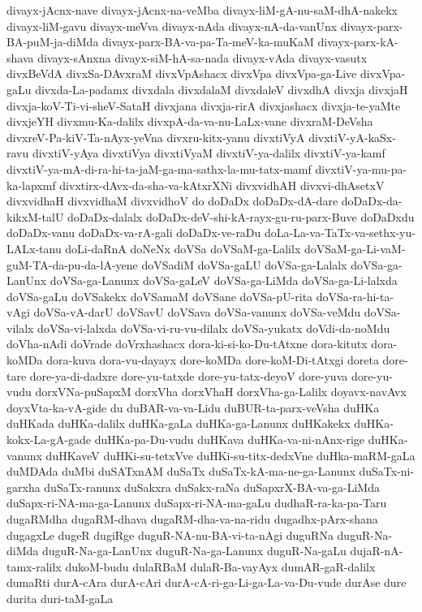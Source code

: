 {divayx-jAcnx-nave
divayx-jAcnx-na-veMba
divayx-liM-gA-nu-saM-dhA-nakekx
divayx-liM-gavu
divayx-meVva
divayx-nAda
divayx-nA-da-vanUnx
divayx-parx-BA-puM-ja-diMda
divayx-parx-BA-va-pa-Ta-meV-ka-muKaM
divayx-parx-kA-shava
divayx-sAnxna
divayx-siM-hA-sa-nada
divayx-vAda
divayx-vasutx
divxBeVdA
divxSa-DAvxraM
divxVpAshacx
divxVpa
divxVpa-ga-Live
divxVpa-gaLu
divxda-La-padamx
divxdala
divxdalaM
divxdaleV
divxdhA
divxja
divxjaH
divxja-koV-Ti-vi-sheV-SataH
divxjana
divxja-rirA
divxjashacx
divxja-te-yaMte
divxjeYH
divxmu-Ka-dalilx
divxpA-da-va-nu-LaLx-vane
divxraM-DeVsha
divxreV-Pa-kiV-Ta-nAyx-yeVna
divxru-kitx-yanu
divxtiVyA
divxtiV-yA-kaSx-ravu
divxtiV-yAya
divxtiVya
divxtiVyaM
divxtiV-ya-dalilx
divxtiV-ya-kamf
divxtiV-ya-mA-di-ra-hi-ta-jaM-ga-ma-sathx-la-mu-tatx-mamf
divxtiV-ya-mu-pa-ka-lapxmf
divxtirx-dAvx-da-sha-va-kAtxrXNi
divxvidhAH
divxvi-dhAsetxV
divxvidhaH
divxvidhaM
divxvidhoV
do
doDaDx
doDaDx-dA-dare
doDaDx-da-kikxM-talU
doDaDx-dalalx
doDaDx-deV-shi-kA-rayx-gu-ru-parx-Buve
doDaDxdu
doDaDx-vanu
doDaDx-va-rA-gali
doDaDx-ve-raDu
doLa-La-va-TaTx-va-sethx-yu-LALx-tanu
doLi-daRnA
doNeNx
doVSa
doVSaM-ga-Lalilx
doVSaM-ga-Li-vaM-guM-TA-da-pu-da-lA-yene
doVSadiM
doVSa-gaLU
doVSa-ga-Lalalx
doVSa-ga-LanUnx
doVSa-ga-Lanunx
doVSa-gaLeV
doVSa-ga-LiMda
doVSa-ga-Li-lalxda
doVSa-gaLu
doVSakekx
doVSamaM
doVSane
doVSa-pU-rita
doVSa-ra-hi-ta-vAgi
doVSa-vA-darU
doVSavU
doVSava
doVSa-vanunx
doVSa-veMdu
doVSa-vilalx
doVSa-vi-lalxda
doVSa-vi-ru-vu-dilalx
doVSa-yukatx
doVdi-da-noMdu
doVha-nAdi
doVrade
doVrxhashacx
dora-ki-si-ko-Du-tAtxne
dora-kitutx
dora-koMDa
dora-kuva
dora-vu-dayayx
dore-koMDa
dore-koM-Di-tAtxgi
doreta
dore-tare
dore-ya-di-dadxre
dore-yu-tatxde
dore-yu-tatx-deyoV
dore-yuva
dore-yu-vudu
dorxVNa-puSapxM
dorxVha
dorxVhaH
dorxVha-ga-Lalilx
doyavx-navAvx
doyxVta-ka-vA-gide
du
duBAR-va-va-Lidu
duBUR-ta-parx-veVsha
duHKa
duHKada
duHKa-dalilx
duHKa-gaLa
duHKa-ga-Lanunx
duHKakekx
duHKa-kokx-La-gA-gade
duHKa-pa-Du-vudu
duHKava
duHKa-va-ni-nAnx-rige
duHKa-vanunx
duHKaveV
duHKi-su-tetxVve
duHKi-su-titx-dedxVne
duHka-maRM-gaLa
duMDAda
duMbi
duSATxnAM
duSaTx
duSaTx-kA-ma-ne-ga-Lanunx
duSaTx-ni-garxha
duSaTx-ranunx
duSakxra
duSakx-raNa
duSapxrX-BA-va-ga-LiMda
duSapx-ri-NA-ma-ga-Lanunx
duSapx-ri-NA-ma-gaLu
dudhaR-ra-ka-pa-Taru
dugaRMdha
dugaRM-dhava
dugaRM-dha-va-na-ridu
dugadhx-pArx-shana
dugagxLe
dugeR
dugiRge
duguR-NA-nu-BA-vi-ta-nAgi
duguRNa
duguR-Na-diMda
duguR-Na-ga-LanUnx
duguR-Na-ga-Lanunx
duguR-Na-gaLu
dujaR-nA-tamx-ralilx
dukoM-budu
dulaRBaM
dulaR-Ba-vayAyx
dumAR-gaR-dalilx
dumaRti
durA-cAra
durA-cAri
durA-cA-ri-ga-Li-ga-La-va-Du-vude
durAse
dure
durita
duri-taM-gaLa
}
